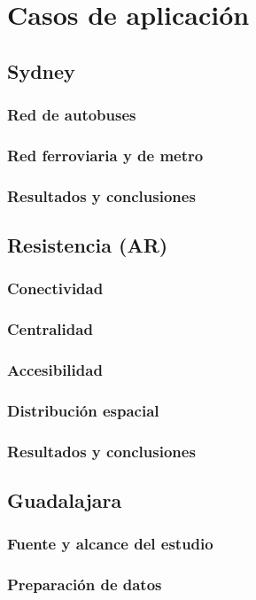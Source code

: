 \chapter{Casos de aplicación}
    \section{Sydney}
        \subsection{Red de autobuses}
        \subsection{Red ferroviaria y de metro}
        \subsection{Resultados y conclusiones}
    \section{Resistencia (AR)} %
        \subsection{Conectividad}
        \subsection{Centralidad}
        \subsection{Accesibilidad}
        \subsection{Distribución espacial}
        \subsection{Resultados y conclusiones}
    \section{Guadalajara}
        \subsection{Fuente y alcance del estudio}
        \subsection{Preparación de datos}
